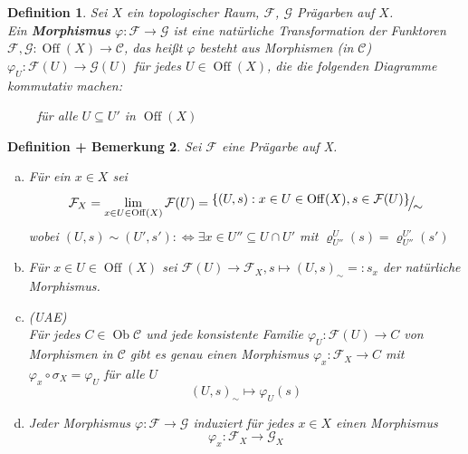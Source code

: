 \documentclass[a4paper,12pt]{report}
\theoremstyle{break}
\newtheorem{Def}{Definition}[section]
\newtheorem{DefBem}[Def]{Definition + Bemerkung}
\theoremstyle{nonumberbreak}
\theoremstyle{nonumberplain}
\newcommand{\emp}[1]{\textbf{\emph{#1}}}
\newcommand{\defterm}[1]{{\index{#1}}\emp{#1}}
\newcommand{\schraffiert}{\ensuremath{\nicefrac{\nicefrac{}{}}{\nicefrac{}{}}}}
\DeclareMathOperator{\Off}{Off}
\DeclareMathOperator{\Ob}{Ob}
\newcommand{\FakRaum}[2]{
  \raisebox{0.7ex}{\ensuremath{#1}}
  \ensuremath{\mkern-3mu}\big/\ensuremath{\mkern-3mu}
  \raisebox{-0.6ex}{\ensuremath{#2}}}
\begin{document}
\begin{Def}
Sei $X$ ein topologischer Raum, $\mathcal F$, $\mathcal G$ Pr\"agarben auf $X$.\\
Ein \defterm{Morphismus} $\varphi: \mathcal F \to \mathcal G$ ist eine nat\"urliche Transformation der Funktoren $\mathcal F, \mathcal G: \Off(X) \to \mathcal C$, das hei\ss t $\varphi$ besteht aus Morphismen (in $\mathcal C$) $\varphi_U: \mathcal F(U) \to \mathcal G(U)$ f\"ur jedes $U\in \Off(X)$, die die folgenden Diagramme kommutativ machen:
\begin{center} $\qquad$ f\"ur alle $U\subseteq U'$ in $\Off(X)$\end{center}
\end{Def}

\begin{DefBem}
Sei $\mathcal F$ eine Pr\"agarbe auf X.
\begin{enumerate}[a)]
\item
	F\"ur ein $x\in X$ sei
		\[\mathcal F_X = \lim_{x\in U \in \Off(X)} \mathcal F(U) = \FakRaum{\{(U,s): x\in U\in \Off(X), s\in \mathcal F(U)\}}{{\sim}}\]
	wobei $(U,s)\sim(U',s') :\Leftrightarrow \exists x\in U'' \subseteq U\cap U'$ mit $\varrho_{U''}^U(s) = \varrho_{U''}^{U'}(s')$
\item
	F\"ur $x\in U \in \Off(X)$ sei $\mathcal F(U) \to \mathcal F_X, s\mapsto (U,s)_{\sim} =: s_x$ der nat\"urliche Morphismus.
\item
	(UAE)\\
	F\"ur jedes $C\in \Ob \mathcal C$ und jede konsistente Familie $\varphi_U: \mathcal F(U) \to C$ von Morphismen in $\mathcal C$ gibt es genau einen Morphismus $\varphi_x: \mathcal F_X \to C$ mit $\varphi_x \circ \sigma_X = \varphi_U$ f\"ur alle $U$
		\[(U,s)_{\sim} \mapsto \varphi_U(s)\]
\item
	Jeder Morphismus $\varphi: \mathcal F \to \mathcal G$ induziert f\"ur jedes $x\in X$ einen Morphismus
		\[\varphi_x: \mathcal F_X \to \mathcal G_X\]
\end{enumerate}\end{DefBem}
\end{document}
